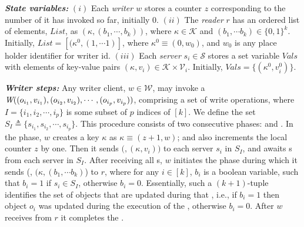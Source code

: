 \textit{\textbf{State variables:}} %
$(i)$ Each  \emph{writer $w$} stores a counter $z$ corresponding to the
number of \wots{}  it  has  invoked so far, initially $0$.
$(ii)$ The  \emph{reader} $r$ has an 
ordered list of elements, $List$, as $(\kappa, (b_1, \cdots, b_k))$,  where 
$\kappa  \in \mathcal{K}$  and 
$(b_1, \cdots b_k) \in  \{0, 1\}^k$. Initially,  
$List= [ ({\kappa}^0, (1, \cdots 1) ]$, where ${\kappa}^0  \equiv (0, w_0)$, 
and $w_0$ is any
place holder identifier for writer id. 
$(iii)$ Each   \emph{server} $s_i \in \mathcal{S}$  stores a set variable $Vals$ 
with elements 
of key-value pairs $({\kappa}, v_i) \in \mathcal{K} \times \mathcal{V}_i$. Initially,
$Vals= \{ ({\kappa}^0, v_i^0)\}$. 

\textit{\textbf{Writer steps:}} Any writer client, $w \in \mathcal{W}$, may invoke a \wot{} ${\textit{W}( (o_{i_1}, v_{i_1}), (o_{i_2}, v_{i_2}), \cdots, (o_{i_p}, v_{i_p}) )}$, comprising a set of write operations,
where  $I = \{i_1, i_2, \cdots, i_p\}$ is some subset of $p$ indices of $[k]$. We define the set  $S_I\triangleq \{s_{i_1}, s_{i_2}, \cdots, s_{i_p}\}$.      
This procedure consists of two consecutive phases: {\writeValue} and {\informReader}.  In the {\writeValue} phase,  $w$ creates a key ${\kappa}$ as  $ {\kappa}  \equiv (z + 1, w)$; and also increments the local counter $z$ by one.   Then it sends $(${\writeValueTag}$, ({\kappa}, v_{i}))$ to each server $s_i$ in $S_I$, and awaits {\ackTag}s  
from each server  in $S_I$.  After receiving all {\ackTag}s,    $w$ initiates the {\informReader} phase during which  it sends 
(\informReaderTag, $({\kappa}, (b_{1}, \cdots b_{k})$) to $r$, where for any $i \in [k]$, $b_i$ is a boolean variable, such that $b_i=1$ if $s_i \in S_I$, otherwise $b_i=0$. 
Essentially, such a $(k+1)$-tuple
identifies the set of objects that are updated during that \wot{}, i.e., if $b_i=1$ then object 
$o_i$ was updated 
during the execution of the  \wot{}, otherwise $b_i=0$.  
After $w$ receives    {\ackTag} 
from $r$ it completes the \wot{}. 

